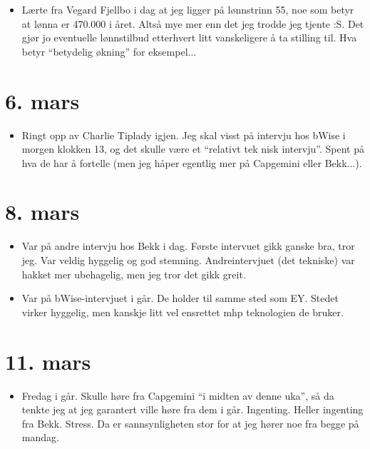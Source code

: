 \documentclass[11pt, norsk]{article}
\begin{document}
\begin{itemize}
  \item Lærte fra Vegard Fjellbo i dag at jeg ligger på lønnstrinn 55, noe som betyr at lønna er 470.000 i året. Altså mye mer enn det jeg trodde jeg tjente :S. Det gjør jo eventuelle lønnstilbud etterhvert litt vanskeligere å ta stilling til. Hva betyr ``betydelig økning'' for eksempel...
\end{itemize}

\section{6. mars} %
\label{sec:6_mars}

\begin{itemize}
  \item Ringt opp av Charlie Tiplady igjen. Jeg skal visst på intervju hos bWise i morgen klokken 13, og det skulle være et ``relativt tek nisk intervju''. Spent på hva de har å fortelle (men jeg håper egentlig mer på Capgemini eller Bekk...).
\end{itemize}


\section{8. mars} %
\label{sec:8_mars}

\begin{itemize}
  \item Var på andre intervju hos Bekk i dag. Første intervuet gikk ganske bra, tror jeg. Var veldig hyggelig og god stemning. Andreintervjuet (det tekniske) var hakket mer ubehagelig, men jeg tror det gikk greit.
  \item Var på bWise-intervjuet i går. De holder til samme sted som EY. Stedet virker hyggelig, men kanskje litt vel ensrettet mhp teknologien de bruker.
\end{itemize}


\section{11. mars} %
\label{sec:11_mars}

\begin{itemize}
  \item Fredag i går. Skulle høre fra Capgemini ``i midten av denne uka'', så da tenkte jeg at jeg garantert ville høre fra dem i går. Ingenting. Heller ingenting fra Bekk. Stress. Da er sannsynligheten stor for at jeg hører noe fra begge på mandag.
\end{itemize}
\end{document}
